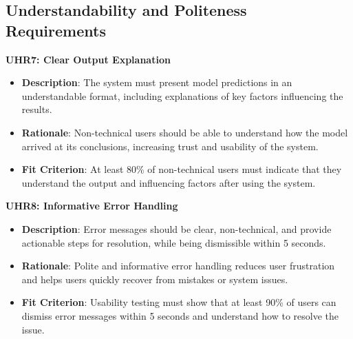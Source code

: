 \documentclass[12pt]{article}
\begin{document}
\subsection{Understandability and Politeness Requirements}
\textbf{UHR7: Clear Output Explanation}
\begin{itemize}
    \item \textbf{Description}: The system must present model predictions in an
    understandable format, including explanations of key factors influencing the
    results.
    \item \textbf{Rationale}: Non-technical users should be able to understand
    how the model arrived at its conclusions, increasing trust and usability of
    the system.
    \item \textbf{Fit Criterion}: At least 80\% of non-technical users must
    indicate that they understand the output and influencing factors after
    using the system.
\end{itemize}
\textbf{UHR8: Informative Error Handling}
\begin{itemize}
    \item \textbf{Description}: Error messages should be clear, non-technical,
    and provide actionable steps for resolution, while being dismissible within
    5 seconds.
    \item \textbf{Rationale}: Polite and informative error handling reduces user
    frustration and helps users quickly recover from mistakes or system issues.
    \item \textbf{Fit Criterion}: Usability testing must show that at least 90\%
    of users can dismiss error messages within 5 seconds and understand how to
    resolve the issue.
\end{itemize}
\end{document}
